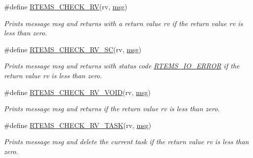\begin{Indent}
\begin{DoxyCompactItemize}
\#define \mbox{\hyperlink{group__rtems__status__checks_ga53297875da9f233759947a4964f1d7dc}{R\+T\+E\+M\+S\+\_\+\+C\+H\+E\+C\+K\+\_\+\+RV}}(rv,  \mbox{\hyperlink{structmsg}{msg}})
\begin{DoxyCompactList}\small\item\em Prints message {\itshape msg} and returns with a return value {\itshape rv} if the return value {\itshape rv} is less than zero. \end{DoxyCompactList}\item 
\#define \mbox{\hyperlink{group__rtems__status__checks_ga3879a3f9bfb4e7fcc77b1d0406366b05}{R\+T\+E\+M\+S\+\_\+\+C\+H\+E\+C\+K\+\_\+\+R\+V\+\_\+\+SC}}(rv,  \mbox{\hyperlink{structmsg}{msg}})
\begin{DoxyCompactList}\small\item\em Prints message {\itshape msg} and returns with status code \mbox{\hyperlink{group__ClassicStatus_gga545d41846817eaba6143d52ee4d9e9feaafb7268b75dfdd3f4518045e52525d45}{R\+T\+E\+M\+S\+\_\+\+I\+O\+\_\+\+E\+R\+R\+OR}} if the return value {\itshape rv} is less than zero. \end{DoxyCompactList}\item 
\#define \mbox{\hyperlink{group__rtems__status__checks_ga287a280046e363c9c5efd9962cacb800}{R\+T\+E\+M\+S\+\_\+\+C\+H\+E\+C\+K\+\_\+\+R\+V\+\_\+\+V\+O\+ID}}(rv,  \mbox{\hyperlink{structmsg}{msg}})
\begin{DoxyCompactList}\small\item\em Prints message {\itshape msg} and returns if the return value {\itshape rv} is less than zero. \end{DoxyCompactList}\item 
\#define \mbox{\hyperlink{group__rtems__status__checks_gac7da49b093229fef71437cb2ff0d304c}{R\+T\+E\+M\+S\+\_\+\+C\+H\+E\+C\+K\+\_\+\+R\+V\+\_\+\+T\+A\+SK}}(rv,  \mbox{\hyperlink{structmsg}{msg}})
\begin{DoxyCompactList}\small\item\em Prints message {\itshape msg} and delete the current task if the return value {\itshape rv} is less than zero. \end{DoxyCompactList}\end{DoxyCompactItemize}
\end{Indent}
